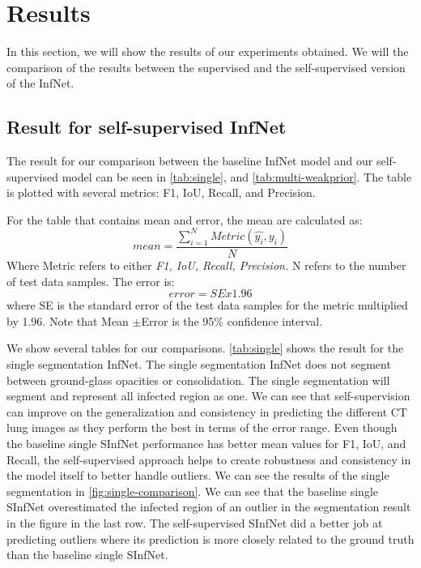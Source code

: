 

\section{Results}
In this section, we will show the results of our experiments obtained. We will the comparison of the results between the supervised and the self-supervised version of the InfNet.

\subsection{Result for self-supervised InfNet}
 The result for our comparison between the baseline InfNet model and our self-supervised model can be seen in \ref{tab:single}, and \ref{tab:multi-weakprior}. The table is plotted with several metrics: F1, IoU, Recall, and Precision. 
 
 For the table that contains mean and error, the mean are calculated as:
 \begin{equation}
mean =  \frac{\sum_{i=1}^{N}Metric(\hat{y_i}, y_i)}{N}
 \end{equation}
 Where Metric refers to either \textit{F1, IoU, Recall, Precision.} N refers to the number of test data samples.
 The error is:
 \begin{equation}
error =  SE x 1.96
 \end{equation}
 where SE is the standard error of the test data samples for the metric multiplied by 1.96.
Note that Mean $\pm$Error is the 95\% confidence interval.
 
 We show several tables for our comparisons. \ref{tab:single} shows the result for the single segmentation InfNet. The single segmentation InfNet does not segment between ground-glass opacities or consolidation. The single segmentation will segment and represent all infected region as one. We can see that self-supervision can improve on the generalization and consistency in predicting the different CT lung images as they perform the best in terms of the error range. Even though the baseline single SInfNet performance has better mean values for F1, IoU, and Recall, the self-supervised approach helps to create robustness and consistency in the model itself to better handle outliers. We can see the results of the single segmentation in \ref{fig:single-comparison}. We can see that the baseline single SInfNet overestimated the infected region of an outlier in the segmentation result in the figure in the last row. The self-supervised SInfNet did a better job at predicting outliers where its prediction is more closely related to the ground truth than the baseline single SInfNet.
 
